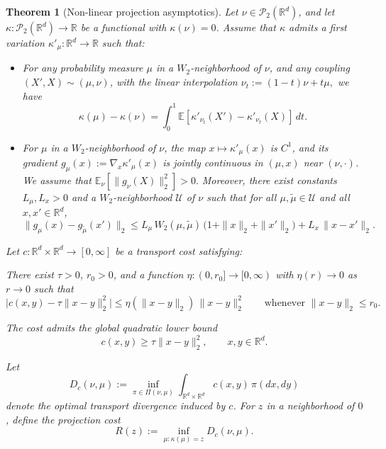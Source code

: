 \documentclass[11pt]{article}
\newtheorem{theorem}{Theorem}
\theoremstyle{definition}
\newcommand{\E}{\mathbb{E}}
\begin{document}
\begin{theorem}[Non-linear projection asymptotics]
\label{thm:projection_law}
Let \(\nu\in \mathcal P_2(\mathbb R^d)\), and let
\(\kappa : \mathcal P_2(\mathbb R^d)\to \mathbb R\) be a functional with
\(\kappa(\nu)=0\).
Assume that \(\kappa\) admits a first variation \(\kappa'_\mu:\mathbb R^d\to\mathbb R\)
such that:

\begin{itemize}
    \item For any probability measure \(\mu\) in a \(W_2\)-neighborhood of \(\nu\),
    and any coupling \((X',X)\sim(\mu,\nu)\), with the linear interpolation $\nu_t := (1-t)\nu + t\mu,$
    we have
    \[
        \kappa(\mu)-\kappa(\nu)
        =
        \int_0^1
        \E\!\left[\kappa'_{\nu_t}(X')-\kappa'_{\nu_t}(X)\right]\,dt.
    \]

    \item For \(\mu\) in a \(W_2\)-neighborhood of \(\nu\), the map
    \(x\mapsto \kappa'_\mu(x)\) is \(C^1\), and its gradient $g_\mu(x):=\nabla_x \kappa'_\mu(x)$
    is jointly continuous in \((\mu,x)\) near \((\nu,\cdot)\).
    {We assume that $\E_\nu[\|g_\nu(X)\|_2^2]>0.$ Moreover, there exist constants \(L_\mu,L_x>0\) and a \(W_2\)-neighborhood
    \(\mathcal U\) of \(\nu\) such that for all \(\mu,\tilde\mu\in\mathcal U\)
    and all \(x,x'\in \mathbb{R}^d\),
    \[
        \|g_\mu(x)-g_{\tilde\mu}(x')\|_2
        \le
L_\mu\,W_2(\mu,\tilde\mu)\,\bigl(1+\|x\|_2+\|x'\|_2\bigr)
        +
        L_x\,\|x-x'\|_2.
    \]}
\end{itemize}
Let \(c:\mathbb R^d\times\mathbb R^d\to[0,\infty]\) be a transport cost satisfying:

\begin{itemize}
\item[(i)] There exist \(\tau>0\), \(r_0>0\), and a function
\(\eta:(0,r_0]\to[0,\infty)\) with \(\eta(r)\to0\) as \(r\to0\) such that
\begin{equation}
\label{eq:uniform_quad_c}
    \bigl|c(x,y)-\tau\|x-y\|_2^2\bigr|
    \le
    \eta(\|x-y\|_2)\,\|x-y\|_2^2
    \qquad\text{whenever }\|x-y\|_2\le r_0.
\end{equation}

{\item[(ii)] The cost admits the global quadratic lower bound
\[
    c(x,y)\ge \tau\|x-y\|_2^2,
    \qquad x,y\in\mathbb R^d.
\]}
\end{itemize}

Let
\[
    D_c(\nu,\mu)
    :=
    \inf_{\pi\in\Pi(\nu,\mu)}
    \int_{\mathbb R^d\times\mathbb R^d} c(x,y)\,\pi(dx,dy)
\]
denote the optimal transport divergence induced by \(c\). For \(z\) in a neighborhood
of \(0\), define the projection cost
\[
    R(z)
    :=
    \inf_{\mu:\kappa(\mu)=z} D_c(\nu,\mu).
\]


\end{theorem}
\end{document}
